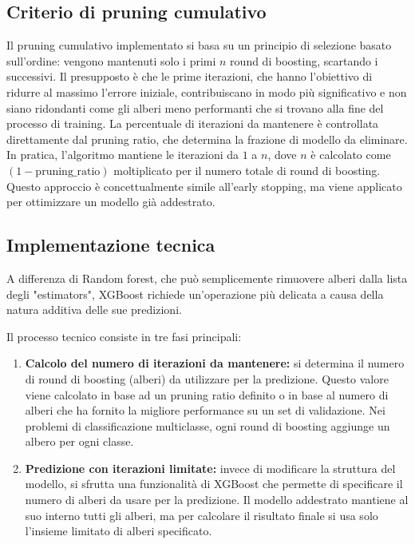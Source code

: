 \documentclass[a4paper,12pt]{report}
\begin{document}
	\subsection{Criterio di pruning cumulativo}
	Il pruning cumulativo implementato si basa su un principio di selezione basato sull'ordine: vengono mantenuti solo i primi $n$ round di boosting, scartando i successivi. Il presupposto è che le prime iterazioni, che hanno l'obiettivo di ridurre al massimo l'errore iniziale, contribuiscano in modo più significativo e non siano ridondanti come gli alberi meno performanti che si trovano alla fine del processo di training. La percentuale di iterazioni da mantenere è controllata direttamente dal pruning ratio, che determina la frazione di modello da eliminare. In pratica, l'algoritmo mantiene le iterazioni da $1$ a $n$, dove $n$ è calcolato come $(1 - \text{pruning\_ratio})$ moltiplicato per il numero totale di round di boosting. Questo approccio è concettualmente simile all'early stopping, ma viene applicato per ottimizzare un modello già addestrato.
	
	\subsection{Implementazione tecnica}
	A differenza di Random forest, che può semplicemente rimuovere alberi dalla lista degli "estimators", XGBoost richiede un'operazione più delicata a causa della natura additiva delle sue predizioni.
	
	Il processo tecnico consiste in tre fasi principali:
	\begin{enumerate}
		\item \textbf{Calcolo del numero di iterazioni da mantenere:} si determina il numero di round di boosting (alberi) da utilizzare per la predizione. Questo valore viene calcolato in base ad un pruning ratio definito o in base al numero di alberi che ha fornito la migliore performance su un set di validazione. Nei problemi di classificazione multiclasse, ogni round di boosting aggiunge un albero per ogni classe.
		\item \textbf{Predizione con iterazioni limitate:} invece di modificare la struttura del modello, si sfrutta una funzionalità di XGBoost che permette di specificare il numero di alberi da usare per la predizione. Il modello addestrato mantiene al suo interno tutti gli alberi, ma per calcolare il risultato finale si usa solo l'insieme limitato di alberi specificato.
	\end{enumerate}
	
\end{document}

